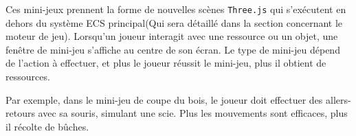 Ces mini-jeux prennent la forme de nouvelles scènes \texttt{Three.js} qui s’exécutent en dehors du système ECS principal(Qui sera détaillé dans la section concernant le moteur de jeu). Lorsqu’un joueur interagit avec une ressource ou un objet, une fenêtre de mini-jeu s’affiche au centre de son écran. Le type de mini-jeu dépend de l’action à effectuer, et plus le joueur réussit le mini-jeu, plus il obtient de ressources.

Par exemple, dans le mini-jeu de coupe du bois, le joueur doit effectuer des allers-retours avec sa souris, simulant une scie. Plus les mouvements sont efficaces, plus il récolte de bûches.